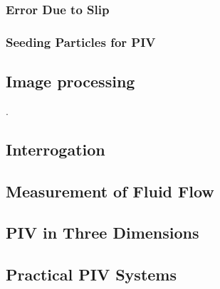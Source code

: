 \subsubsection{Error Due to Slip}

\subsubsection{Seeding Particles for PIV}

\subsection{Image processing}

\cite{soloff1997, willert1997}.

\subsection{Interrogation}

\subsection{Measurement of Fluid Flow}

\subsection{PIV in Three Dimensions}

\subsection{Practical PIV Systems}


